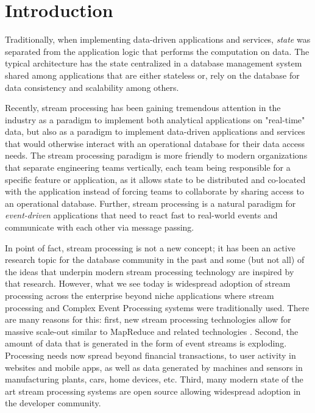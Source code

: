 
\section{Introduction}
\label{sec:intro}

Traditionally, when implementing data-driven applications and services, \emph{state} was separated from the application logic that performs the computation on data. The typical architecture has the state centralized in a database management system shared among applications that are either stateless or, rely on the database for data consistency and scalability among others.

Recently, stream processing has been gaining tremendous attention in the industry as a paradigm to implement both analytical applications on "real-time" data, but also as a paradigm to implement data-driven applications and services that would otherwise interact with an operational database for their data access needs. The stream processing paradigm is more friendly to modern organizations that separate engineering teams vertically, each team being responsible for a specific feature or application, as it allows state to be distributed and co-located with the application instead of forcing teams to collaborate by sharing access to an operational database. Further, stream processing is a natural paradigm for \emph{event-driven} applications that need to react fast to real-world events and communicate with each other via message passing. 

In point of fact, stream processing is not a new concept; it has been an active research topic for the database community in the past \cite{chen2000niagaracq,cherniack2003scalable,chandrasekaran2003telegraphcq,abadi2003aurora,arasu2004stream} and some (but not all) of the ideas that underpin modern stream processing technology are inspired by that research. However, what we see today is widespread adoption of stream processing across the enterprise beyond niche applications where stream processing and Complex Event Processing systems were traditionally used. There are many reasons for this: first, new stream processing technologies allow for massive scale-out similar to MapReduce \cite{dean2008mapreduce} and related technologies \cite{zaharia2010spark,stratosphere,battre2010nephele}. Second, the amount of data that is generated in the form of event streams is exploding. Processing needs now spread beyond financial transactions, to user activity in websites and mobile apps, as well as data generated by machines and sensors in manufacturing plants, cars, home devices, etc. Third, many modern state of the art stream processing systems are open source allowing widespread adoption in the developer community. 

